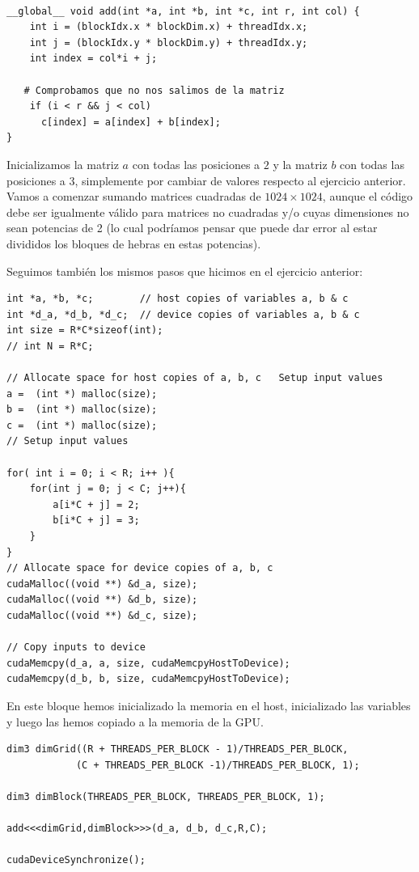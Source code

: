\documentclass[11pt]{article}
\theoremstyle{plain}
\begin{document}
\begin{verbatim}

__global__ void add(int *a, int *b, int *c, int r, int col) {
    int i = (blockIdx.x * blockDim.x) + threadIdx.x;
    int j = (blockIdx.y * blockDim.y) + threadIdx.y;
    int index = col*i + j;

   # Comprobamos que no nos salimos de la matriz
    if (i < r && j < col)
      c[index] = a[index] + b[index];
}
\end{verbatim}

Inicializamos la matriz $a$ con todas las posiciones a $2$ y la matriz $b$ con todas las posiciones a $3$, simplemente por cambiar de valores respecto al ejercicio anterior. Vamos a comenzar sumando matrices cuadradas de $1024\times 1024$, aunque el código debe ser igualmente válido para matrices no cuadradas y/o cuyas dimensiones no sean potencias de 2 (lo cual podríamos pensar que puede dar error al estar divididos los bloques de hebras en estas potencias).

Seguimos también los mismos pasos que hicimos en el ejercicio anterior:
\begin{verbatim}
int *a, *b, *c;        // host copies of variables a, b & c
int *d_a, *d_b, *d_c;  // device copies of variables a, b & c
int size = R*C*sizeof(int);
// int N = R*C;

// Allocate space for host copies of a, b, c   Setup input values
a =  (int *) malloc(size);
b =  (int *) malloc(size);
c =  (int *) malloc(size);
// Setup input values

for( int i = 0; i < R; i++ ){
    for(int j = 0; j < C; j++){
        a[i*C + j] = 2;
        b[i*C + j] = 3;
    }
}
// Allocate space for device copies of a, b, c
cudaMalloc((void **) &d_a, size);
cudaMalloc((void **) &d_b, size);
cudaMalloc((void **) &d_c, size);

// Copy inputs to device
cudaMemcpy(d_a, a, size, cudaMemcpyHostToDevice);
cudaMemcpy(d_b, b, size, cudaMemcpyHostToDevice);
\end{verbatim}

En este bloque hemos inicializado la memoria en el host, inicializado las variables y luego las hemos copiado a la memoria de la GPU.

\begin{verbatim}
dim3 dimGrid((R + THREADS_PER_BLOCK - 1)/THREADS_PER_BLOCK,
 			(C + THREADS_PER_BLOCK -1)/THREADS_PER_BLOCK, 1);

dim3 dimBlock(THREADS_PER_BLOCK, THREADS_PER_BLOCK, 1);

add<<<dimGrid,dimBlock>>>(d_a, d_b, d_c,R,C);

cudaDeviceSynchronize();
\end{verbatim}
\end{document}
